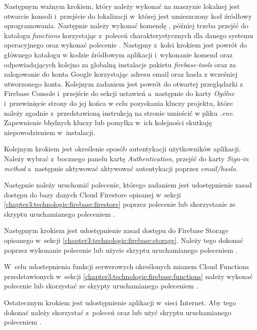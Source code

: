 \documentclass[../Kamil_Kowalewski_Main.tex]{subfiles}
\begin{document}
{{        Następnym ważnym krokiem, który należy wykonać na maszynie lokalnej jest
        otwarcie konsoli i~przejście do lokalizacji w~której jest umieszczony kod
        źródłowy oprogramowania. Następnie należy wykonać komendę
         , później trzeba przejść do katalogu \textit{functions}
        korzystając z~poleceń charakterystycznych dla danego systemu operacyjnego oraz
        wykonać polecenie  . Następny z~kolei krokiem jest powrót
        do głównego katalogu w kodzie źródłowym aplikacji i~wykonanie komend
         oraz 
        odpowiadających kolejno za globalną instalacje pakietu \textit{firebase-tools}
        oraz za zalogowanie do konta Google korzystając adresu email oraz hasła
        z wcześniej utworzonego konta. Kolejnym zadaniem jest powrót do otwartej
        przeglądarki z Firebase Console i~przejście do sekcji ustawień a~następnie do
        karty \textit{Ogólne} i~przewinięcie strony do jej końca w celu pozyskania
        kluczy projektu, które należy zgodnie z~przedstawioną instrukcją na stronie
        umieścić w pliku \textit{.env}. Zapewnienie błędnych kluczy lub pomyłka w~ich
        kolejności skutkuję niepowodzieniem w~instalacji.

        Kolejnym krokiem jest określenie sposób autentykacji użytkowników aplikacji.
        Należy wybrać z~bocznego panelu kartę \textit{Authentication}, przejść do karty
        \textit{Sign-in method} a~następnie aktywować aktywować autentykacji poprzez
        \textit{email/haslo}.

        Następnie należy uruchomić polecenie, którego zadaniem jest udostępnienie zasad
        dostępu do bazy danych Cloud Firestore opisanej w~sekcji
        \ref{chapter3:technologie:firebase:firestore} poprzez polecenie
         lub skorzystanie ze
        skryptu uruchamianego poleceniem  .

        Następnym krokiem jest udostępnienie zasad dostępu do Firebase Storage
        opisanego w~sekcji \ref{chapter3:technologie:firebase:storage}. Należy tego
        dokonać poprzez wykonanie polecenie
         lub użycie skryptu uruchamianego
        poleceniem  .

        W~celu udostepnienia funkcji serwerowych określonych mianem Cloud Functions
        przedstawionych w~sekcji \ref{chapter3:technologie:firebase:functions} należy
        wykonać polecenie  lub skorzystać ze
        skrypty uruchamianego poleceniem  .

        Ostatecznym krokiem jest udostępnienie aplikacji w~sieci Internet. Aby tego
        dokonać należy skorzystać z~poleceń  oraz
         lub użyć skryptu uruchamianego
        poleceniem  .
    }
}
\end{document}
